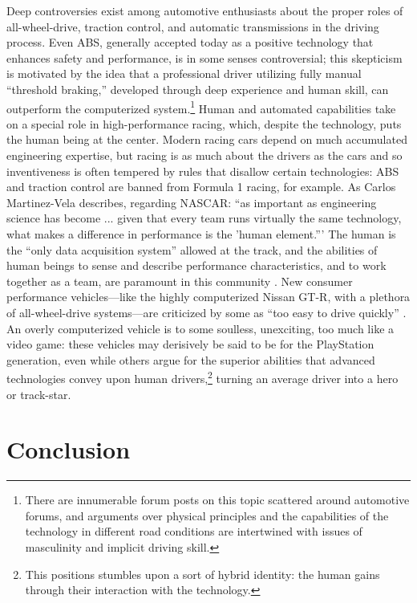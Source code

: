 Deep controversies exist among automotive
enthusiasts about the proper roles of all-wheel-drive, traction
control, and automatic transmissions in the driving process. Even ABS,
generally accepted today as a positive technology that enhances safety and
performance, is in some senses controversial; this skepticism is
motivated by the idea that 
a professional driver utilizing fully manual ``threshold braking,''
developed through deep experience and human skill, can outperform the
computerized system.\footnote{There are innumerable forum posts on
  this topic scattered around automotive forums, and arguments over
  physical principles and the capabilities of the technology in
  different road conditions are
  intertwined with issues of masculinity and implicit driving skill.}
Human and automated capabilities take on a special role in
  high-performance racing, which, despite the technology, puts the
  human being at the center. Modern racing cars depend on
much accumulated engineering expertise, but racing is as much about
the drivers as the cars and so inventiveness is often tempered by
rules that disallow certain technologies:  ABS and traction control are
banned from Formula 1 racing, for example. As Carlos Martinez-Vela
describes, regarding NASCAR: ``as important as engineering science has
become ... given
that every team runs virtually the same technology, what makes a
difference in performance is the 'human element.''' The human is the ``only data acquisition
system'' allowed at the track, and the abilities of human beings to
sense and describe performance characteristics, and to work together
as a team, are paramount in this community \cite[p.
  178]{martinezvela}. New consumer performance vehicles---like the 
highly computerized Nissan GT-R, with a plethora of all-wheel-drive
systems---are criticized by some as ``too easy to drive quickly'' \cite{edmunds}.
An overly computerized vehicle is to some soulless, unexciting, too much like
a video game: these vehicles may derisively be said to be for the
PlayStation generation, even while others argue for the superior
abilities that advanced technologies convey upon human
drivers,\footnote{This positions stumbles upon a sort of hybrid
  identity: the  human gains through their 
interaction with the technology.}
turning an average driver into a hero or track-star.


\section{Conclusion}

